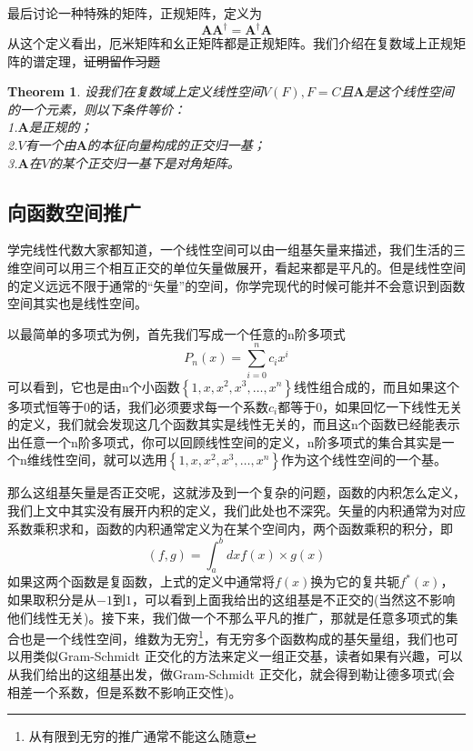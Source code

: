 \documentclass[12pt,a4paper,openany,twoside]{book}
\newtheorem{theorem}{Theorem}[section]
\numberwithin{equation}{section}
\begin{document}
    最后讨论一种特殊的矩阵，正规矩阵，定义为
    \begin{equation}
      \mathbf{A}\mathbf{A}^{\dagger}=\mathbf{A}^{\dagger}\mathbf{A}
    \end{equation}
    从这个定义看出，厄米矩阵和幺正矩阵都是正规矩阵。我们介绍在复数域上正规矩阵的谱定理，\sout{证明留作习题}
    \begin{theorem}
      设我们在复数域上定义线性空间$V(F),F=C$且$\mathbf{A}$是这个线性空间的一个元素，则以下条件等价：\\
      1.$\mathbf{A}$是正规的；\\
      2.$V$有一个由$\mathbf{A}$的本征向量构成的正交归一基；\\
      3.$\mathbf{A}$在$V$的某个正交归一基下是对角矩阵。
    \end{theorem}

    \subsection{向函数空间推广}
    学完线性代数大家都知道，一个线性空间可以由一组基矢量来描述，我们生活的三维空间可以用三个相互正交的单位矢量做展开，看起来都是平凡的。但是线性空间的定义远远不限于通常的“矢量”的空间，你学完现代的时候可能并不会意识到函数空间其实也是线性空间。

    以最简单的多项式为例，首先我们写成一个任意的n阶多项式
    \begin{equation}
      P_n(x)=\sum_{i=0}^n c_i x^i
    \end{equation}
    可以看到，它也是由n个小函数$\left\{1,x,x^2,x^3,\dots,x^n\right\}$线性组合成的，而且如果这个多项式恒等于0的话，我们必须要求每一个系数$c_i$都等于0，如果回忆一下线性无关的定义，我们就会发现这几个函数其实是线性无关的，而且这n个函数已经能表示出任意一个n阶多项式，你可以回顾线性空间的定义，n阶多项式的集合其实是一个n维线性空间，就可以选用$\left\{1,x,x^2,x^3,\dots,x^n\right\}$作为这个线性空间的一个基。

    那么这组基矢量是否正交呢，这就涉及到一个复杂的问题，函数的内积怎么定义，我们上文中其实没有展开内积的定义，我们此处也不深究。矢量的内积通常为对应系数乘积求和，函数的内积通常定义为在某个空间内，两个函数乘积的积分，即
    \begin{equation}
      \left(f,g\right)=\int_a^b dx f(x)\times g(x)
    \end{equation}
    如果这两个函数是复函数，上式的定义中通常将$f(x)$换为它的复共轭$f^*(x)$，如果取积分是从$-1$到$1$，可以看到上面我给出的这组基是不正交的(当然这不影响他们线性无关)。接下来，我们做一个不那么平凡的推广，那就是任意多项式的集合也是一个线性空间，维数为无穷\footnote{从有限到无穷的推广通常不能这么随意}，有无穷多个函数构成的基矢量组，我们也可以用类似Gram-Schmidt 正交化的方法来定义一组正交基，读者如果有兴趣，可以从我们给出的这组基出发，做Gram-Schmidt 正交化，就会得到勒让德多项式(会相差一个系数，但是系数不影响正交性)。
\end{document}
